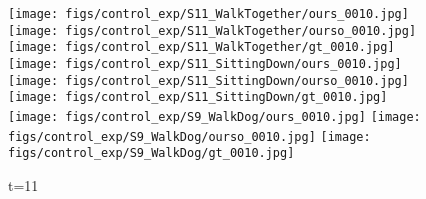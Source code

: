 \documentclass{article}
\begin{document}
\begin{appendix}
\clearpage

\begin{figure*}[!thbp]
    \centering
    \vspace{60pt}
	\begin{subfigure}{0.04\linewidth}
        \raggedleft
    \end{subfigure}
    \begin{subfigure}{0.12\linewidth}
        \caption*{t=11}
        \vspace{-7pt}
	    \texttt{[image: figs/control\_exp/S11\_WalkTogether/ours\_0010.jpg]}
	    \texttt{[image: figs/control\_exp/S11\_WalkTogether/ourso\_0010.jpg]}
	    \vspace{.2cm}
  		\texttt{[image: figs/control\_exp/S11\_WalkTogether/gt\_0010.jpg]}
  		\texttt{[image: figs/control\_exp/S11\_SittingDown/ours\_0010.jpg]}
  		\texttt{[image: figs/control\_exp/S11\_SittingDown/ourso\_0010.jpg]}
  		\vspace{.2cm}
  		\texttt{[image: figs/control\_exp/S11\_SittingDown/gt\_0010.jpg]}
  		\texttt{[image: figs/control\_exp/S9\_WalkDog/ours\_0010.jpg]}
  		\texttt{[image: figs/control\_exp/S9\_WalkDog/ourso\_0010.jpg]}
  		\vspace{.2cm}
  		\texttt{[image: figs/control\_exp/S9\_WalkDog/gt\_0010.jpg]}

\end{subfigure}
\end{figure*}
\end{appendix}
\end{document}

